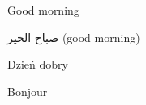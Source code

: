\documentclass[12pt]{article}
\begin{document}
Good morning

\begin{Arabic}
صباح الخير (\textenglish{good morning})
\end{Arabic}

\begin{polish}
Dzień dobry
\end{polish}

\begin{french}
Bonjour
\end{french}
\end{document}
